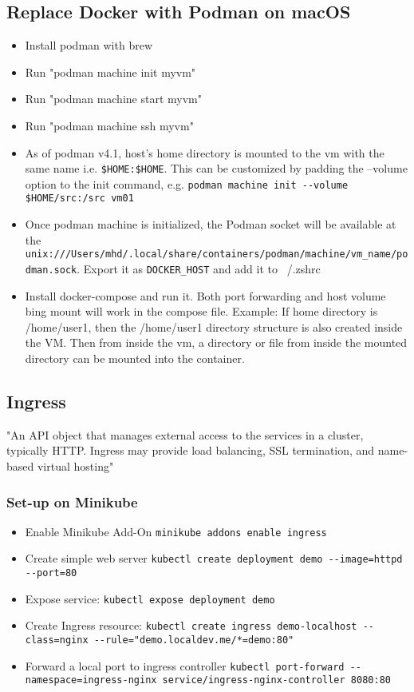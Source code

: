 \documentclass{article}
\begin{document}
\subsection{Replace Docker with Podman on macOS}
\begin{itemize}
  \item Install podman with brew
  \item Run "podman machine init myvm"
  \item Run "podman machine start myvm"
  \item Run "podman machine ssh myvm"
  \item As of podman v4.1, host's home directory is mounted to the vm with the same name i.e. \lstinline{$HOME:$HOME}. This can be customized by padding the --volume option to the init command, e.g. \lstinline{podman machine init --volume $HOME/src:/src vm01}
  \item Once podman machine is initialized, the Podman socket will be available at the \lstinline{unix:///Users/mhd/.local/share/containers/podman/machine/vm_name/podman.sock}. Export it as \lstinline{DOCKER_HOST} and add it to ~/.zshrc
  \item Install docker-compose and run it. Both port forwarding and host volume bing mount will work in the compose file.
  Example: If home directory is /home/user1, then the /home/user1 directory structure is also created inside the VM. 
  Then from inside the vm, a directory or file from inside the mounted directory can be mounted into the container.

\end{itemize}

\subsection{Ingress}
"An API object that manages external access to the services in a cluster, typically HTTP.
Ingress may provide load balancing, SSL termination, and name-based virtual hosting"
\subsubsection{Set-up on Minikube}
\begin{itemize}
	\item Enable Minikube Add-On \lstinline{minikube addons enable ingress}
	\item Create simple web server \lstinline{kubectl create deployment demo --image=httpd --port=80}
	\item Expose service: \lstinline{kubectl expose deployment demo}
	\item Create Ingress resource: \lstinline{kubectl create ingress demo-localhost --class=nginx --rule="demo.localdev.me/*=demo:80"}
	\item Forward a local port to ingress controller \lstinline{kubectl port-forward --namespace=ingress-nginx service/ingress-nginx-controller 8080:80}

\end{itemize}
\end{document}
